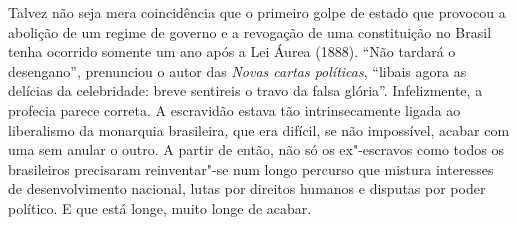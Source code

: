 Talvez não seja mera coincidência que o primeiro golpe de estado que
provocou a abolição de um regime de governo e a revogação de uma
constituição no Brasil tenha ocorrido somente um ano após a Lei Áurea
(1888). “Não tardará o desengano”, prenunciou o autor das \textit{Novas
cartas políticas}, “libais agora as delícias da celebridade: breve
sentireis o travo da falsa glória”. Infelizmente, a profecia parece
correta. A escravidão estava tão intrinsecamente ligada ao liberalismo
da monarquia brasileira, que era difícil, se não impossível, acabar com
uma sem anular o outro. A partir de então, não só os ex"-escravos como
todos os brasileiros precisaram reinventar"-se num longo percurso que
mistura interesses de desenvolvimento nacional, lutas por direitos
humanos e disputas por poder político. E que está longe, muito longe de
acabar.  
